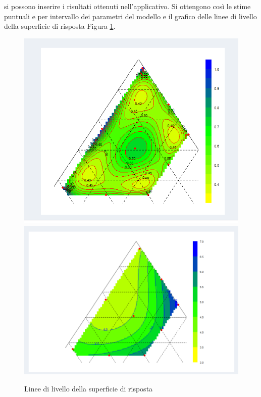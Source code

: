 \documentclass[
  11pt,
]{book}
\begin{document}
si possono inserire i risultati ottenuti nell'applicativo. Si ottengono così le stime puntuali e per intervallo dei parametri del modello e il grafico delle linee di livello della superficie di risposta Figura \ref{fig:mixfig24}.

\begin{figure}[ht]
\includegraphics[width=0.5\linewidth]{Immagini/Mixt/24_suprisp} \includegraphics[width=0.5\linewidth]{Immagini/Mixt/25_suprisp} \caption{Linee di livello della superficie di risposta}\label{fig:mixfig24}
\end{figure}

\backmatter

  

\end{document}
